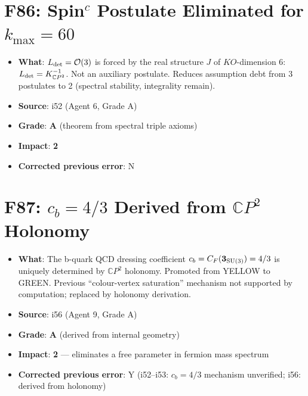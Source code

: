 \documentclass[11pt,a4paper]{article}
\newcommand{\grade}[1]{\textbf{#1}}
\newcommand{\impact}[1]{\textbf{#1}}
\begin{document}
\section{F86: Spin$^c$ Postulate Eliminated for $k_{\max} = 60$}
\begin{itemize}[nosep]
\item \textbf{What}: $L_{\rm det} = \mathcal{O}(3)$ is forced by the real structure $J$ of $KO$-dimension 6: $L_{\rm det} = K_{\mathbb{C}P^2}^{-1}$. Not an auxiliary postulate. Reduces assumption debt from 3 postulates to 2 (spectral stability, integrality remain).
\item \textbf{Source}: i52 (Agent 6, Grade A)
\item \textbf{Grade}: \grade{A} (theorem from spectral triple axioms)
\item \textbf{Impact}: \impact{2}
\item \textbf{Corrected previous error}: N
\end{itemize}

\section{F87: $c_b = 4/3$ Derived from $\mathbb{C}P^2$ Holonomy}
\begin{itemize}[nosep]
\item \textbf{What}: The b-quark QCD dressing coefficient $c_b = C_F(\mathbf{3}_{\rm SU(3)}) = 4/3$ is uniquely determined by $\mathbb{C}P^2$ holonomy. Promoted from YELLOW to GREEN. Previous ``colour-vertex saturation'' mechanism not supported by computation; replaced by holonomy derivation.
\item \textbf{Source}: i56 (Agent 9, Grade A)
\item \textbf{Grade}: \grade{A} (derived from internal geometry)
\item \textbf{Impact}: \impact{2} --- eliminates a free parameter in fermion mass spectrum
\item \textbf{Corrected previous error}: Y (i52--i53: $c_b = 4/3$ mechanism unverified; i56: derived from holonomy)
\end{itemize}

\end{document}
